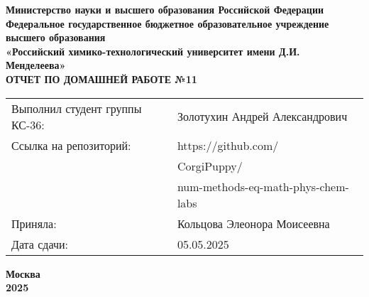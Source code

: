 \documentclass[12pt, a4paper]{report}
\begin{document}
	\begin{titlepage}
		\begin{center}
			\large \textbf{Министерство науки и высшего образования Российской Федерации} \\
			\large \textbf{Федеральное государственное бюджетное образовательное учреждение высшего образования} \\
			\large \textbf{«Российский химико-технологический университет имени Д.И. Менделеева»} \\

			\vspace*{4cm}
			\LARGE \textbf{ОТЧЕТ ПО ДОМАШНЕЙ РАБОТЕ №11}

			\vspace*{4cm}
			\begin{flushright}
				\Large
				\begin{tabular}{>{\raggedleft\arraybackslash}p{9cm} p{10cm}}
					Выполнил студент группы КС-36: & Золотухин Андрей Александрович \\
					Ссылка на репозиторий: & https://github.com/ \\
					& CorgiPuppy/ \\
					& num-methods-eq-math-phys-chem-labs \\
					Приняла: & Кольцова Элеонора Моисеевна \\
					Дата сдачи: & 05.05.2025 \\
				\end{tabular}
			\end{flushright}

			\vspace*{6cm}
			\Large \textbf{Москва \\ 2025}
		\end{center}
	\end{titlepage}

	\tableofcontents
	\thispagestyle{empty}
	\newpage

\end{document}
